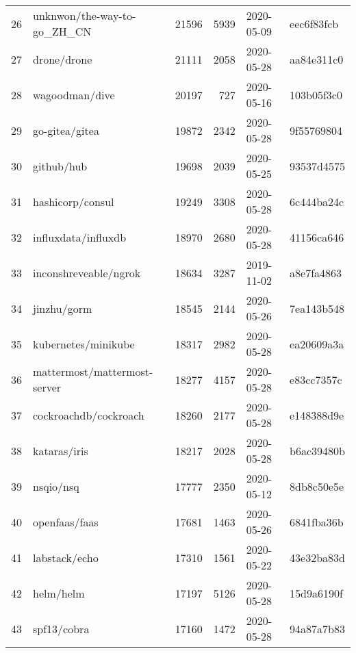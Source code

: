 \begin{longtable}{llrrll}
    26  &                        unknwon/the-way-to-go\_ZH\_CN &  21596 &   5939 & 2020-05-09 &  eec6f83fcb \\
    27  &                                        drone/drone &  21111 &   2058 & 2020-05-28 &  aa84e311c0 \\
    28  &                                     wagoodman/dive &  20197 &    727 & 2020-05-16 &  103b05f3c0 \\
    29  &                                     go-gitea/gitea &  19872 &   2342 & 2020-05-28 &  9f55769804 \\
    30  &                                         github/hub &  19698 &   2039 & 2020-05-25 &  93537d4575 \\
    31  &                                   hashicorp/consul &  19249 &   3308 & 2020-05-28 &  6c444ba24c \\
    32  &                                influxdata/influxdb &  18970 &   2680 & 2020-05-28 &  41156ca646 \\
    33  &                              inconshreveable/ngrok &  18634 &   3287 & 2019-11-02 &  a8e7fa4863 \\
    34  &                                        jinzhu/gorm &  18545 &   2144 & 2020-05-26 &  7ea143b548 \\
    35  &                                kubernetes/minikube &  18317 &   2982 & 2020-05-28 &  ea20609a3a \\
    36  &                       mattermost/mattermost-server &  18277 &   4157 & 2020-05-28 &  e83cc7357c \\
    37  &                              cockroachdb/cockroach &  18260 &   2177 & 2020-05-28 &  e148388d9e \\
    38  &                                       kataras/iris &  18217 &   2028 & 2020-05-28 &  b6ac39480b \\
    39  &                                          nsqio/nsq &  17777 &   2350 & 2020-05-12 &  8db8c50e5e \\
    40  &                                      openfaas/faas &  17681 &   1463 & 2020-05-26 &  6841fba36b \\
    41  &                                      labstack/echo &  17310 &   1561 & 2020-05-22 &  43e32ba83d \\
    42  &                                          helm/helm &  17197 &   5126 & 2020-05-28 &  15d9a6190f \\
    43  &                                        spf13/cobra &  17160 &   1472 & 2020-05-28 &  94a87a7b83 \\

\end{longtable}
